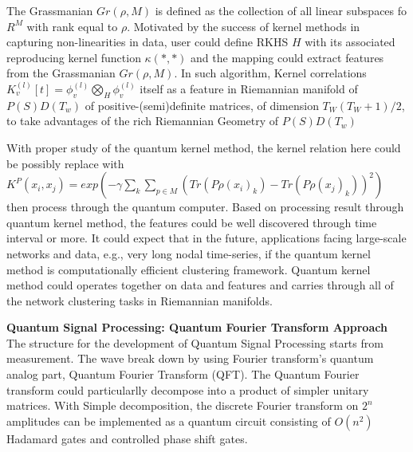 \documentclass{article}
\begin{document}
The Grassmanian $Gr(\rho, M)$ is defined as the collection 
of all linear subspaces fo $R^M$ with rank equal to $\rho$. 
Motivated by the success of kernel methods in capturing 
non-linearities in data, user could define RKHS $H$ with its associated
reproducing kernel function $\kappa(*,*)$ and the mapping 
could extract features from the Grassmanian $Gr(\rho, M)$. In such 
algorithm, Kernel correlations 
$K_v^{(l)}[t] = \phi_v^{(l)} \bigotimes_H \phi_v^{(l)}$ itself 
as a feature in Riemannian manifold of $P(S)D(T_w)$ of 
positive-(semi)definite matrices, of dimension $T_W (T_W+1)/2$,
to take advantages of the rich Riemannian Geometry of $P(S)D(T_w)$

With proper study of the quantum kernel method, the kernel relation 
here could be possibly replace with $
  K^P (x_i,x_j) = exp(-\gamma \sum_k \sum_{p \in M} 
  (Tr(P \rho(x_i)_k)-Tr(P \rho(x_j)_k))^2)
$
then process through the quantum computer. Based on processing 
result through quantum kernel method, the features could be well 
discovered through time interval or more. It could expect that in 
the future, applications facing large-scale networks and data, e.g., very long 
nodal time-series, if the quantum kernel method is computationally efficient clustering 
framework.  Quantum kernel method could operates together 
on data and features 
and carries through all of the network clustering tasks in 
Riemannian manifolds. 

\textbf{Quantum Signal Processing: Quantum Fourier Transform Approach}\newline
The structure for the development of Quantum Signal Processing starts from
measurement. The wave break down by using Fourier transform's quantum analog
part, Quantum Fourier Transform (QFT). The Quantum Fourier transform could
particularlly decompose into a product of simpler unitary matrices.
With Simple decomposition, the discrete Fourier transform on $2^n$ amplitudes
can be implemented as a quantum circuit consisting of $O(n^2)$ Hadamard
gates and controlled phase shift gates.
\end{document}
